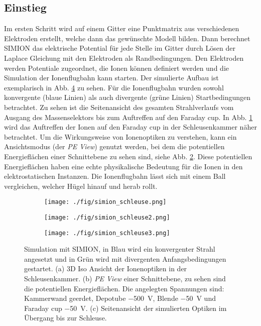 \subsection{Einstieg}
Im ersten Schritt wird auf einem Gitter eine Punktmatrix aus verschiedenen Elektroden erstellt, welche dann das gewünschte Modell bilden.
Dann berechnet SIMION das elektrische Potential für jede Stelle im Gitter durch Lösen der Laplace Gleichung mit den Elektroden als Randbedingungen.
Den Elektroden werden Potentiale zugeordnet, die Ionen können definiert werden und die Simulation der Ionenflugbahn kann starten.
Der simulierte Aufbau ist exemplarisch in Abb. \ref{fig:simion_schleuse} zu sehen.
Für die Ionenflugbahn wurden sowohl konvergente (blaue Linien) als auch divergente (grüne Linien) Startbedingungen betrachtet.
Zu sehen ist die Seitenansicht des gesamten Strahlverlaufs vom Ausgang des Massenselektors bis zum Auftreffen auf den Faraday cup.
In Abb. \ref{fig:0} wird das Auftreffen der Ionen auf den Faraday cup in der Schleusenkammer näher betrachtet.
Um die Wirkungsweise von Ionenoptiken zu verstehen, kann ein Ansichtsmodus (der \textit{PE View}) genutzt werden, bei dem die potentiellen Energieflächen einer Schnittebene zu sehen sind, siehe Abb. \ref{fig:1}.
Diese potentiellen Energieflächen haben eine echte physikalische Bedeutung für die Ionen in den elektrostatischen Instanzen.
Die Ionenflugbahn lässt sich mit einem Ball vergleichen, welcher Hügel hinauf und herab rollt.
\begin{figure}
  \centering
  \begin{subfigure}[h]{0.45\textwidth}
    \texttt{[image: ./fig/simion\_schleuse.png]}
    \caption{}
    \label{fig:0}
  \end{subfigure}\hfill
  \begin{subfigure}[h]{0.5\textwidth}
    \texttt{[image: ./fig/simion\_schleuse2.png]}
    \caption{}
    \label{fig:1}
  \end{subfigure}\hfill
  \begin{subfigure}[b]{1\textwidth}
    \texttt{[image: ./fig/simion\_schleuse3.png]}
    \caption{}
    \label{fig:2}
  \end{subfigure}
  \caption{Simulation mit SIMION, in Blau wird ein konvergenter Strahl angesetzt und in Grün wird mit divergenten Anfangsbedingungen gestartet. (a) 3D Iso Ansicht der Ionenoptiken in der Schleusenkammer. (b) \textit{PE View} einer Schnittebene, zu sehen sind die potentiellen Energieflächen. Die angelegten Spannungen sind: Kammerwand geerdet, Depotube \SI{-500}{\volt}, Blende \SI{-50}{\volt} und Faraday cup \SI{-50}{\volt}. (c) Seitenansicht der simulierten Optiken im Übergang bis zur Schleuse.}
  \label{fig:simion_schleuse}
\end{figure}
